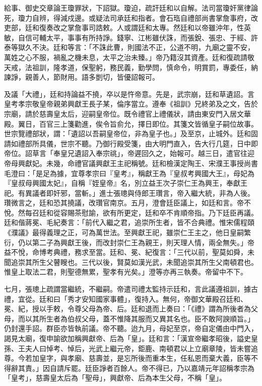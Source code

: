 \begin{pinyinscope}
給事、御史交章論王瓊罪狀，下詔獄。瓊迫，疏訐廷和以自解。法司當瓊奸黨律論死，瓊力自辨，得減戍邊。或疑法司承廷和指者。會石珤自禮部尚書掌詹事府，改吏部，廷和復奏改之掌詹事司誥敕。人或謂廷和太專。然廷和以帝雖沖年，性英敏，自信可輔太平，事事有所持諍。錢寧、江彬雖伏誅，而張銳、張忠、于經、許泰等獄久不決。廷和等言：「不誅此曹，則國法不正，公道不明，九廟之靈不安，萬姓之心不服，禍亂之機未息，太平之治未臻。」帝乃籍沒其資產。廷和復疏請敬天戒，法祖訓，隆孝道，保聖躬，務民義，勤學問，慎命令，明賞罰，專委任，納諫諍，親善人，節財用。語多剴切，皆優詔報可。

及議「大禮」，廷和持論益不撓，卒以是忤帝意。先是，武宗崩，廷和草遺詔。言皇考孝宗敬皇帝親弟興獻王長子某，倫序當立。遵奉《祖訓》兄終弟及之文，告於宗廟，請於慈壽皇太后，迎嗣皇帝位。既令禮官上禮儀狀，請由東安門入居文華殿。翼日，百官三上箋勸進，俟令旨俞允，擇日即位。其箋文皆循皇子嗣位故事。世宗覽禮部狀，謂：「遺詔以吾嗣皇帝位，非為皇子也。」及至京，止城外。廷和固請如禮部所具儀，世宗不聽。乃御行殿受箋，由大明門直入，告大行几筵，日中即帝位。詔草言「奉皇兄遺詔入奉宗祧」，帝遲回久之，始報可。越三日，遣官往迎帝母興獻妃。未幾，命禮官議興獻王主祀稱號。廷和檢漢定陶王、宋濮王事授尚書毛澄曰：「是足為據，宜尊孝宗曰『皇考』，稱獻王為『皇叔考興國大王』，母妃為『皇叔母興國太妃』，自稱『姪皇帝』名，別立益王次子崇仁王為興王，奉獻王祀。有異議者即奸邪，當斬。」進士張璁與侍郎王瓚言，帝入繼大統，非為人後。瓚微言之，廷和恐其撓議，改瓚官南京。五月，澄會廷臣議上，如廷和言。帝不悅。然每召廷和從容賜茶慰諭，欲有所更定，廷和卒不肯順帝指。乃下廷臣再議。廷和偕蔣冕、毛紀奏言：「前代入繼之君，追崇所生者，皆不合典禮。惟宋儒程頤《濮議》最得義理之正，可為萬世法。至興獻王祀，雖崇仁王主之，他日皇嗣繁衍，仍以第二子為興獻王後，而改封崇仁王為親王，則天理人情，兩全無失。」帝益不悅，命博考典禮，務求至當。廷和、冕、紀復言：「三代以前，聖莫如舜，未聞追崇其所生父瞽瞍也。三代以後，賢莫如漢光武，未聞追崇其所生父南頓君也。惟皇上取法二君，則聖德無累，聖孝有光矣。」澄等亦再三執奏。帝留中不下。

七月，張璁上疏謂當繼統，不繼嗣。帝遣司禮太監持示廷和，言此議遵祖訓，據古禮，宜從。廷和曰「秀才安知國家事體」，復持入。無何，帝御文華殿召廷和、冕、紀，授以手敕，令尊父母為帝、后。廷和退而上奏曰：「《禮》謂為所後者為父母，而以其所生者為伯叔父母，蓋不惟降其服而又異其名也。臣不敢阿諛順旨。」仍封還手詔。群臣亦皆執前議。帝不聽。迨九月，母妃至京，帝自定儀由中門入，謁見太廟，復申諭欲加稱興獻帝、后為「皇」。廷和言：「漢宣帝繼孝昭後，謚史皇孫、王夫人曰悼考、悼后，光武上繼元帝，鉅鹿、南頓君以上立廟章陵，皆未嘗追尊。今若加皇字，與孝廟、慈壽並，是忘所後而重本生，任私恩而棄大義，臣等不得辭其責。」因自請斥罷。廷臣諍者百餘人。帝不得已，乃以嘉靖元年詔稱孝宗為「皇考」，慈壽皇太后為「聖母」，興獻帝、后為本生父母，不稱「皇」。


\end{pinyinscope}
